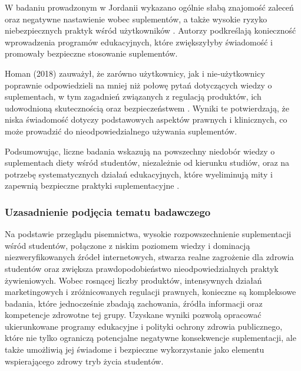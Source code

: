 W badaniu prowadzonym w Jordanii wykazano ogólnie słabą znajomość zaleceń oraz negatywne nastawienie wobec suplementów, a także wysokie ryzyko niebezpiecznych praktyk wśród użytkowników \cite{elsahoryi2023prevalence}. Autorzy podkreślają konieczność wprowadzenia programów edukacyjnych, które zwiększyłyby świadomość i promowały bezpieczne stosowanie suplementów.  

Homan (2018) zauważył, że zarówno użytkownicy, jak i nie‐użytkownicy poprawnie odpowiedzieli na mniej niż połowę pytań dotyczących wiedzy o suplementach, w tym zagadnień związanych z regulacją produktów, ich udowodnioną skutecznością oraz bezpieczeństwem \cite{homan2018dietary}. Wyniki te potwierdzają, że niska świadomość dotyczy podstawowych aspektów prawnych i klinicznych, co może prowadzić do nieodpowiedzialnego używania suplementów.  

Podsumowując, liczne badania wskazują na powszechny niedobór wiedzy o suplementach diety wśród studentów, niezależnie od kierunku studiów, oraz na potrzebę systematycznych działań edukacyjnych, które wyeliminują mity i zapewnią bezpieczne praktyki suplementacyjne \cite{knowledge-and-use,pharmacist-knowledge-and-use,elsahoryi2023prevalence,chiba2020educational,homan2018dietary}.

\subsubsection{Uzasadnienie podjęcia tematu badawczego}

Na podstawie przeglądu pisemnictwa, wysokie rozpowszechnienie suplementacji wśród studentów, połączone z niskim poziomem wiedzy i dominacją niezweryfikowanych źródeł internetowych, stwarza realne zagrożenie dla zdrowia studentów oraz zwiększa prawdopodobieństwo nieodpowiedzialnych praktyk żywieniowych. Wobec rosnącej liczby produktów, intensywnych działań marketingowych i zróżnicowanych regulacji prawnych, konieczne są kompleksowe badania, które jednocześnie zbadają zachowania, źródła informacji oraz kompetencje zdrowotne tej grupy. Uzyskane wyniki pozwolą opracować ukierunkowane programy edukacyjne i polityki ochrony zdrowia publicznego, które nie tylko ograniczą potencjalne negatywne konsekwencje suplementacji, ale także umożliwią jej świadome i bezpieczne wykorzystanie jako elementu wspierającego zdrowy tryb życia studentów.

